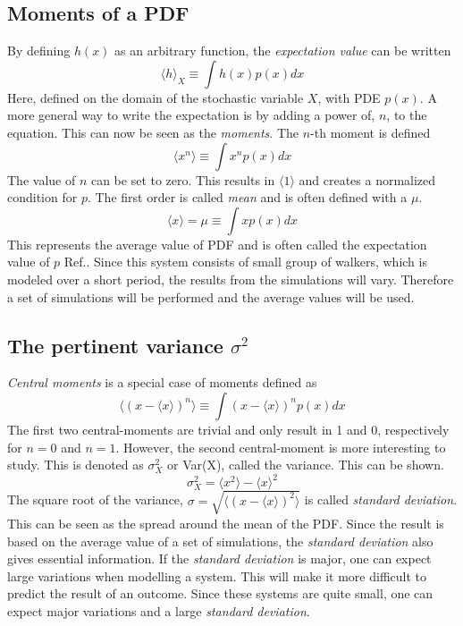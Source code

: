 \documentclass[%
twoside,                 %
final,                   %
chapterprefix=true,      %
open=right               %
10pt]{book}
\begin{document}
\subsection{Moments of a PDF}
By defining $h(x)$ as an arbitrary function, the \emph{expectation value} can be written
\begin{equation}
    \langle h \rangle_X \equiv \int h(x)p(x)dx
\end{equation}
Here, defined on the domain of the stochastic variable $X$, with PDE $p(x)$. A more general way to write the expectation is by adding a power of, $n$, to the equation. This can now be seen as the \emph{moments}. The $n$-th moment is defined
\begin{equation}
    \langle x^n \rangle \equiv \int x^np(x)dx
\end{equation}
The value of $n$ can be set to zero. This results in $\langle 1 \rangle$ and creates a normalized condition for $p$. The first order is called \emph{mean} and is often defined with a $\mu$.
\begin{equation}
    \langle x \rangle = \mu \equiv \int xp(x)dx
\end{equation}
This represents the average value of PDF and is often called the expectation value of $p$ Ref.\cite{hjorth2011computational}. Since this system consists of small group of walkers, which is modeled over a short period, the results from the simulations will vary. Therefore a set of simulations will be performed and the average values will be used. 
\subsection{The pertinent variance $\sigma ^2$}
\emph{Central moments} is a special case of moments defined as
\begin{equation}
    \langle (x-\langle x \rangle)^n \rangle \equiv \int (x-\langle x \rangle)^np(x)dx
\end{equation}
The first two central-moments are trivial and only result in 1 and 0, respectively for $n=0$ and $n=1$. However, the second central-moment is more interesting to study. This is denoted as $\sigma^2_X$ or Var(X), called the variance. This can be shown.
\begin{equation}
    \sigma^2_X  = \langle x^2\rangle -\langle x \rangle^2 
\end{equation}
The square root of the variance, $\sigma = \sqrt{\langle (x-\langle x \rangle)^2 \rangle}$ is called \emph{standard deviation}. This can be seen as the spread around the mean of the PDF. Since the result is based on the average value of a set of simulations, the \emph{standard deviation} also gives essential information. If the \emph{standard deviation} is major, one can expect large variations when modelling a system. This will make it more difficult to predict the result of an outcome. Since these systems are quite small, one can expect major variations and a large \emph{standard deviation}. 
\end{document}
